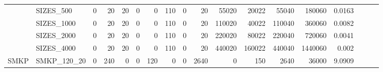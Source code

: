 \begin{landscape}
\begin{longtable}[c]{llrrrrrrrrrrrrrlll}
		& SIZES\_500                   & 0                           & 20                         & 20                         & 0                           & 0                          & 110                        & 0                          & 20                        & 55020                     & 20022                      & 55040                      & 180060                         & 0.0163                        &                          &                          &                          \\
		& SIZES\_1000                  & 0                           & 20                         & 20                         & 0                           & 0                          & 110                        & 0                          & 20                        & 110020                    & 40022                      & 110040                     & 360060                         & 0.0082                        &                          &                          &                          \\
		& SIZES\_2000                  & 0                           & 20                         & 20                         & 0                           & 0                          & 110                        & 0                          & 20                        & 220020                    & 80022                      & 220040                     & 720060                         & 0.0041                        &                          &                          &                          \\
		& SIZES\_4000                  & 0                           & 20                         & 20                         & 0                           & 0                          & 110                        & 0                          & 20                        & 440020                    & 160022                     & 440040                     & 1440060                        & 0.002                         &                          &                          &                          \\ \hline
		\multirow{5}{*}{SMKP}       & SMKP\_120\_20                & 0                           & 240                        & 0                          & 0                           & 120                        & 0                          & 0                          & 2640                      & 0                         & 150                        & 2640                       & 36000                          & 9.0909                        &                          &                          &                          \\

\end{longtable}
\end{landscape}
